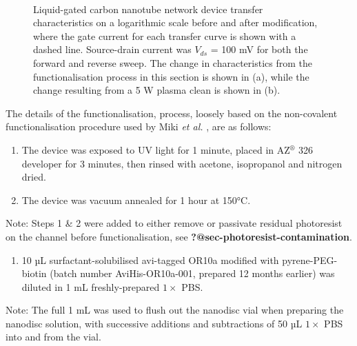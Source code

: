 \documentclass[
  a4paper,
]{scrbook}
\providecommand{\tightlist}{%
  \setlength{\itemsep}{0pt}\setlength{\parskip}{0pt}}\usepackage{longtable,booktabs,array}
\begin{document}
\begin{figure}
\begin{minipage}[t]{0.45\linewidth}
{}

\end{minipage}%
%
\begin{minipage}[t]{0.01\linewidth}

{\centering 

~

}

\end{minipage}%

\caption{\label{fig-OR10a-TX-comparison}Liquid-gated carbon nanotube
network device transfer characteristics on a logarithmic scale before
and after modification, where the gate current for each transfer curve
is shown with a dashed line. Source-drain current was \(V_{ds}\) = 100
mV for both the forward and reverse sweep. The change in characteristics
from the functionalisation process in this section is shown in (a),
while the change resulting from a 5 W plasma clean is shown in (b).}

\end{figure}

The details of the functionalisation, process, loosely based on the
non-covalent functionalisation procedure used by Miki \emph{et al.}
\autocite{Miki2019}, are as follows:

\begin{enumerate}
\def\labelenumi{\arabic{enumi}.}
\item
  The device was exposed to UV light for 1 minute, placed in
  AZ\(^\circledR\) 326 developer for 3 minutes, then rinsed with
  acetone, isopropanol and nitrogen dried.
\item
  The device was vacuum annealed for 1 hour at 150°C.
\end{enumerate}

Note: Steps 1 \& 2 were added to either remove or passivate residual
photoresist on the channel before functionalisation, see
\textbf{?@sec-photoresist-contamination}.

\begin{enumerate}
\def\labelenumi{\arabic{enumi}.}
\setcounter{enumi}{2}
\tightlist
\item
  10 µL surfactant-solubilised avi-tagged OR10a modified with
  pyrene-PEG-biotin (batch number AviHis-OR10a-001, prepared 12 months
  earlier) was diluted in 1 mL freshly-prepared \(1 \times\) PBS.
\end{enumerate}

Note: The full 1 mL was used to flush out the nanodisc vial when
preparing the nanodisc solution, with successive additions and
subtractions of 50 µL \(1 \times\) PBS into and from the vial.
\end{document}
